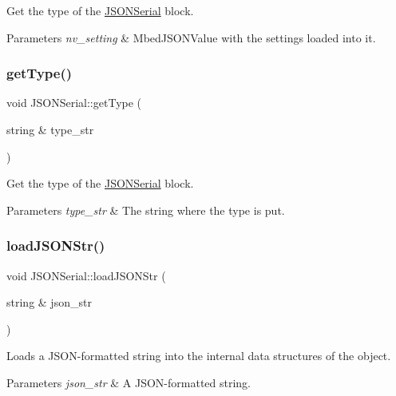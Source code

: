 Get the type of the \hyperlink{classJSONSerial}{J\+S\+O\+N\+Serial} block. 
\begin{DoxyParams}{Parameters}
{\em nv\+\_\+setting} & Mbed\+J\+S\+O\+N\+Value with the settings loaded into it. \\
\hline
\end{DoxyParams}
\mbox{\label{classJSONSerial_ace1745d4308eef3f8734186cf55496e2}} 
\subsubsection{\texorpdfstring{get\+Type()}{getType()}}
{\footnotesize\ttfamily void J\+S\+O\+N\+Serial\+::get\+Type (\begin{DoxyParamCaption}\item[{string \&}]{type\+\_\+str }\end{DoxyParamCaption})}

Get the type of the \hyperlink{classJSONSerial}{J\+S\+O\+N\+Serial} block. 
\begin{DoxyParams}{Parameters}
{\em type\+\_\+str} & The string where the type is put. \\
\hline
\end{DoxyParams}
\mbox{\label{classJSONSerial_a21379660c361f4d26f0fd42a4734662e}} 
\subsubsection{\texorpdfstring{load\+J\+S\+O\+N\+Str()}{loadJSONStr()}}
{\footnotesize\ttfamily void J\+S\+O\+N\+Serial\+::load\+J\+S\+O\+N\+Str (\begin{DoxyParamCaption}\item[{string \&}]{json\+\_\+str }\end{DoxyParamCaption})}

Loads a J\+S\+O\+N-\/formatted string into the internal data structures of the object. 
\begin{DoxyParams}{Parameters}
{\em json\+\_\+str} & A J\+S\+O\+N-\/formatted string. \\
\hline
\end{DoxyParams}
\mbox{\label{classJSONSerial_a32f2b8eddfbe137c61b77352445e1e09}} 
